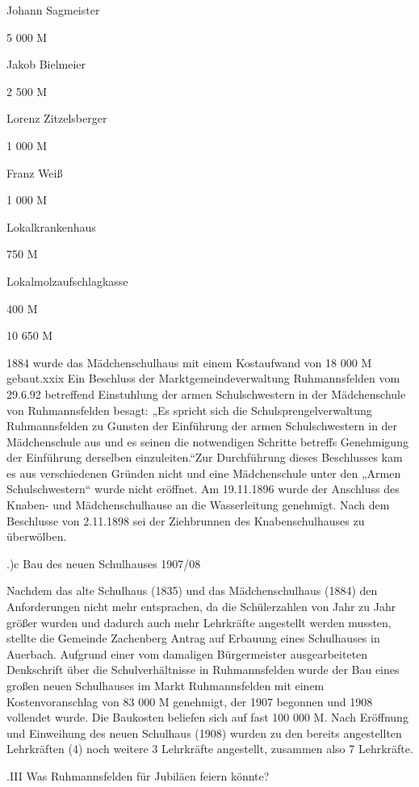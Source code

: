 \documentclass{book}
\begin{document}
Johann Sagmeister

5 000 M

Jakob Bielmeier

2 500 M

Lorenz Zitzelsberger

1 000 M

Franz Weiß

1 000 M

Lokalkrankenhaus

   750 M

Lokalmolzaufschlagkasse

   400 M



10 650 M



1884 wurde das Mädchenschulhaus mit einem Kostaufwand von 18 000 M gebaut.xxix
Ein Beschluss der Marktgemeindeverwaltung Ruhmannsfelden vom 29.6.92 betreffend
Einstuhlung der armen Schulschwestern in der Mädchenschule von Ruhmannsfelden
besagt: „Es spricht sich die Schulsprengelverwaltung Ruhmannsfelden zu Gunsten
der Einführung der armen Schulschwestern in der Mädchenschule aus und es seinen
die notwendigen Schritte betreffs Genehmigung der Einführung derselben
einzuleiten.“Zur Durchführung dieses Beschlusses kam es aus verschiedenen
Gründen nicht und eine Mädchenschule unter den „Armen Schulschwestern“ wurde
nicht eröffnet. Am 19.11.1896 wurde der Anschluss des Knaben- und
Mädchenschulhause an die Wasserleitung genehmigt. Nach dem Beschlusse von
2.11.1898 sei der Ziehbrunnen des Knabenschulhauses zu überwölben.

.)c Bau des neuen Schulhauses 1907/08

Nachdem das alte Schulhaus (1835) und das Mädchenschulhaus (1884) den
Anforderungen nicht mehr entsprachen, da die Schülerzahlen von Jahr zu Jahr
größer wurden und dadurch auch mehr Lehrkräfte angestellt werden mussten,
stellte die Gemeinde Zachenberg Antrag auf Erbauung eines Schulhauses in
Auerbach. Aufgrund einer vom damaligen Bürgermeister ausgearbeiteten Denkschrift
über die Schulverhältnisse in Ruhmannsfelden wurde der Bau eines großen neuen
Schulhauses im Markt Ruhmannsfelden mit einem Kostenvoranschlag von 83 000 M
genehmigt, der 1907 begonnen und 1908 vollendet wurde. Die Baukosten beliefen
sich auf fast 100 000 M. Nach Eröffnung und Einweihung des neuen Schulhaus
(1908) wurden zu den bereits angestellten Lehrkräften (4) noch weitere 3
Lehrkräfte angestellt, zusammen also 7 Lehrkräfte.

.III Was Ruhmannsfelden für Jubiläen feiern könnte?
\end{document}
